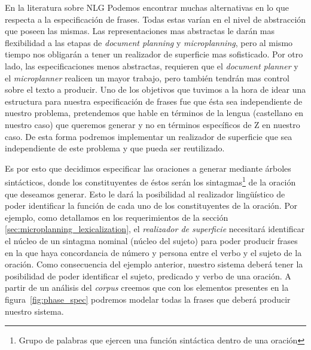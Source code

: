 En la literatura sobre NLG Podemos encontrar muchas alternativas en lo que respecta a la especificación de frases. Todas estas varían en el nivel de abstracción que poseen las mismas. Las representaciones mas abstractas le darán mas flexibilidad a las etapas de \textit{document planning} y \textit{microplanning}, pero al mismo tiempo nos obligarán a tener un realizador de superficie mas sofisticado. Por otro lado, las especificaciones menos abstractas, requieren que el \textit{document planner} y el \textit{microplanner} realicen un mayor trabajo, pero también tendrán mas control sobre el texto a producir. Uno de los objetivos que tuvimos a la hora de idear una estructura para nuestra especificación de frases fue que ésta sea independiente de nuestro problema, pretendemos que hable en términos de la lengua (castellano en nuestro caso) que queremos generar y no en términos específicos de Z en nuestro caso. De esta forma podremos implementar un realizador de superficie que sea independiente de este problema y que pueda ser reutilizado. %


Es por esto que decidimos especificar las oraciones a generar mediante árboles sintácticos, donde los constituyentes de éstos serán los sintagmas\footnote{Grupo de palabras que ejercen una función sintáctica dentro de una oración} de la oración que deseamos generar. Esto le dará la posibilidad al realizador lingüístico de poder identificar la función de cada uno de los constituyentes de la oración. Por ejemplo, como detallamos en los requerimientos de la sección \ref{sec:microplanning_lexicalization}, el \emph{realizador de superficie} necesitará identificar el núcleo de un sintagma nominal (núcleo del sujeto) para poder producir frases en la que haya concordancia de número y persona entre el verbo y el sujeto de la oración. Como consecuencia del ejemplo anterior, nuestro sistema deberá tener la posibilidad de poder identificar el sujeto, predicado y verbo de una oración. A partir de un análisis del \emph{corpus} creemos que con los elementos presentes en la figura~\ref{fig:phase_spec} podremos modelar todas la frases que deberá producir nuestro sistema.

